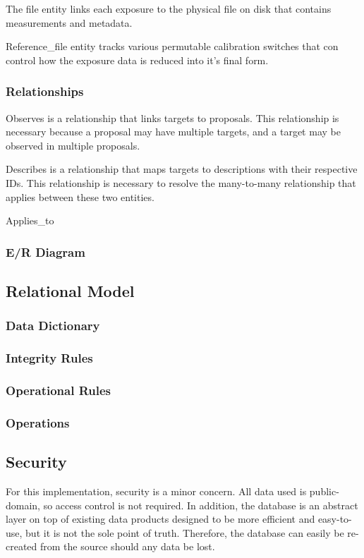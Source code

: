 \documentclass[a4paper,11pt]{article}
\begin{document}
The file entity links each exposure to the physical file on disk that contains measurements and metadata. 

Reference\_file entity tracks various permutable calibration switches that con control how the exposure data is reduced into it's final form.  

\subsubsection{Relationships}
Observes is a relationship that links targets to proposals.  This relationship is necessary because a proposal may have multiple targets, and a target may be observed in multiple proposals.  

Describes is a relationship that maps targets to descriptions with their respective IDs.  This relationship is necessary to resolve the many-to-many relationship that applies between these two entities.  

Applies\_to 

\subsubsection{E/R Diagram}

\subsection{Relational Model}

\subsubsection{Data Dictionary}
\subsubsection{Integrity Rules}
\subsubsection{Operational Rules}
\subsubsection{Operations}

\subsection{Security}
For this implementation, security is a minor concern.  All data used is public-domain, so access control is not required.  In addition, the database is an abstract layer on top of existing data products designed to be more efficient and easy-to-use, but it is not the sole point of truth.  Therefore, the database can easily be re-created from the source should any data be lost.
\end{document}
